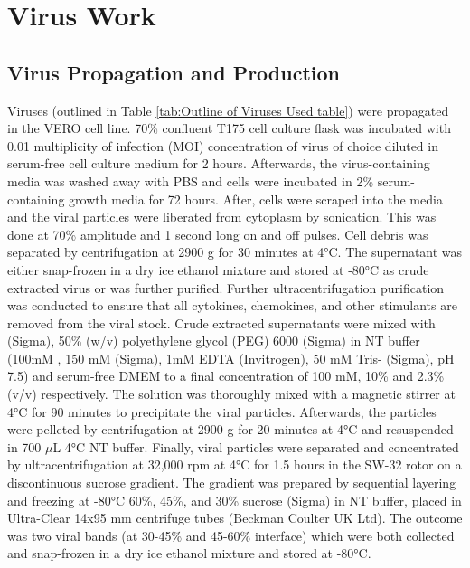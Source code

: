 \section{Virus Work} \label{sec:Virus Work}
\subsection{Virus Propagation and Production} \label{subsec:Virus Propagation and Production}
Viruses (outlined in Table \ref{tab:Outline of Viruses Used table}) were propagated in the VERO cell line. 70\% confluent T175 cell culture flask was incubated with 0.01 multiplicity of infection (MOI) concentration of virus of choice diluted in serum-free cell culture medium for 2 hours. Afterwards, the virus-containing media was washed away with PBS and cells were incubated in 2\% serum-containing growth media for 72 hours. After, cells were scraped into the media and the viral particles were liberated from cytoplasm by sonication. This was done at 70\% amplitude and 1 second long on and off pulses. Cell debris was separated by centrifugation at 2900 g for 30 minutes at 4°C. The supernatant was either snap-frozen in a dry ice ethanol mixture and stored at -80°C as crude extracted virus or was further purified. Further ultracentrifugation purification was conducted to ensure that all cytokines, chemokines, and other stimulants are removed from the viral stock. Crude extracted supernatants were mixed with  (Sigma), 50\% (w/v) polyethylene glycol (PEG) 6000 (Sigma) in NT buffer (100mM , 150 mM  (Sigma), 1mM EDTA (Invitrogen), 50 mM Tris- (Sigma), pH 7.5) and serum-free DMEM to a final concentration of 100 mM, 10\% and 2.3\% (v/v) respectively. The solution was thoroughly mixed with a magnetic stirrer at 4°C for 90  minutes to precipitate the viral particles. Afterwards, the particles were pelleted by centrifugation at 2900 g for 20 minutes at 4°C and resuspended in 700 \(\mu\)L 4°C NT buffer. Finally, viral particles were separated and concentrated by ultracentrifugation at 32,000 rpm at 4°C for 1.5 hours in the SW-32 rotor on a discontinuous sucrose gradient. The gradient was prepared by sequential layering and freezing at -80°C 60\%, 45\%, and 30\% sucrose (Sigma) in NT buffer, placed in Ultra-Clear 14x95 mm centrifuge tubes (Beckman Coulter UK Ltd). The outcome was two viral bands (at 30-45\% and 45-60\% interface) which were both collected and snap-frozen in a dry ice ethanol mixture and stored at -80°C.

